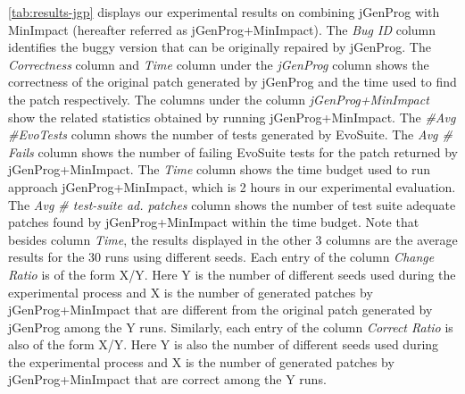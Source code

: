 \documentclass[]{sig-alternate}
\begin{document}
\autoref{tab:results-jgp} displays our experimental results on combining jGenProg with MinImpact (hereafter referred as jGenProg+\-MinImpact). The \emph{Bug ID} column identifies the buggy version that can be originally repaired by jGenProg. The \emph{Correctness} column and \emph{Time} column under the \emph{jGenProg} column shows the correctness of the original patch generated by jGenProg and the time used to find the patch respectively.  The columns under the column \emph{jGenProg+MinImpact} show the related statistics obtained by running jGenProg+\-Min\-Impact. The \emph{\#Avg \#EvoTests} column shows the number of tests generated by EvoSuite. The \emph{Avg \# Fails} column shows the number of failing EvoSuite tests for the patch returned by jGenProg+MinImpact. The \emph{Time} column shows the time budget used to run approach jGenProg+\-Min\-Impact, which is 2 hours in our experimental evaluation. The \emph{Avg \# test-suite ad. patches} column shows the number of test suite adequate patches found by jGenProg+MinImpact within the time budget. Note that besides column \emph{Time}, the results displayed in the other 3 columns are the average results for the 30 runs using different seeds. Each entry of the column \emph{Change Ratio} is of the form X/Y. Here Y is the number of different seeds used during the experimental process and X is the number of generated patches by jGenProg+MinImpact that are different from the original patch generated by jGenProg among the Y runs. Similarly, each entry of the column \emph{Correct Ratio} is also of the form X/Y. Here Y is also the number of different seeds used during the experimental process and X is the number of generated patches by jGenProg+MinImpact that are correct among the Y runs. 
\end{document}
